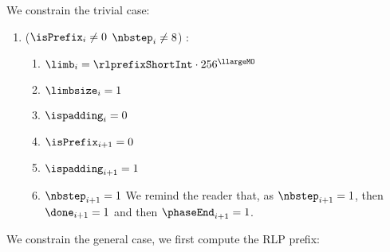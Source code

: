 We constrain the trivial case:
\begin{enumerate}[resume] 
    \item \If ($\isPrefix_{i} \neq 0$ \et $\nbstep_{i} \neq 8$) \Then:
    \begin{enumerate}
        \item $\limb_{i}=\rlprefixShortInt \cdot 256 ^{\llargeMO}$
        \item $\limbsize_{i}=1$
        \item $\ispadding_{i} =0$
        \item $\isPrefix_{i+1}=0$
        \item $\ispadding_{i+1}=1$
        \item $\nbstep_{i+1}=1$
        \saNote{} We remind the reader that, as $\nbstep_{i+1}=1$, then $\done_{i+1}=1$ and then $\phaseEnd_{i+1}=1$.
    \end{enumerate}
\end{enumerate}
We constrain the general case, we first compute the RLP prefix:
